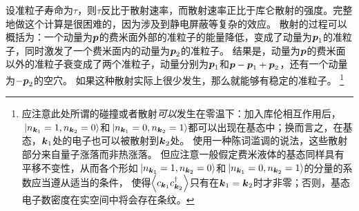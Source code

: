 设准粒子寿命为$\tau$，则$\tau$反比于散射速率，而散射速率正比于库仑散射的强度。完整地做这个计算是很困难的，因为涉及到静电屏蔽等复杂的效应。
散射的过程可以概括为：一个动量为$\vb*{p}$的费米面外部的准粒子的能量降低，变成了动量为$\vb*{p}_1$的准粒子，同时激发了一个费米面内的动量为$\vb*{p}_2$的准粒子。
结果是，动量为$\vb*{p}$的费米面以外的准粒子衰变成了两个准粒子，动量分别为$\vb*{p}_1$和$\vb*{p} - \vb*{p}_1 + \vb*{p}_2$，还有一个动量为$-\vb*{p}_2$的空穴。
如果这种散射实际上很少发生，那么就能够有稳定的准粒子。%
\footnote{
    应注意此处所谓的碰撞或者散射\emph{可以}发生在零温下：加入库伦相互作用后，$\ket*{n_{\vb*{k}_1} = 1, n_{\vb*{k}_2} = 0 }$和$\ket*{n_{\vb*{k}_1} = 0, n_{\vb*{k}_2} = 1 }$都可以出现在基态中；换而言之，在基态，$\vb*{k}_1$处的电子也可以被散射到$\vb*{k}_2$处。
    使用一种陈词滥调的说法，这些散射部分来自量子涨落而非热涨落。
    但应注意一般假定费米液体的基态同样具有平移不变性，从而各个形如$\ket*{n_{\vb*{k}_1} = 1, n_{\vb*{k}_2} = 0 }$和$\ket*{n_{\vb*{k}_1} = 0, n_{\vb*{k}_2} = 1 }$的分量的系数应当遵从适当的条件，
    使得$\expval{c_{\vb*{k}_1} c^\dagger_{\vb*{k}_2}}$只有在$\vb*{k}_1 = \vb*{k}_2$时才非零；否则，基态电子数密度在实空间中将会存在条纹。
}

